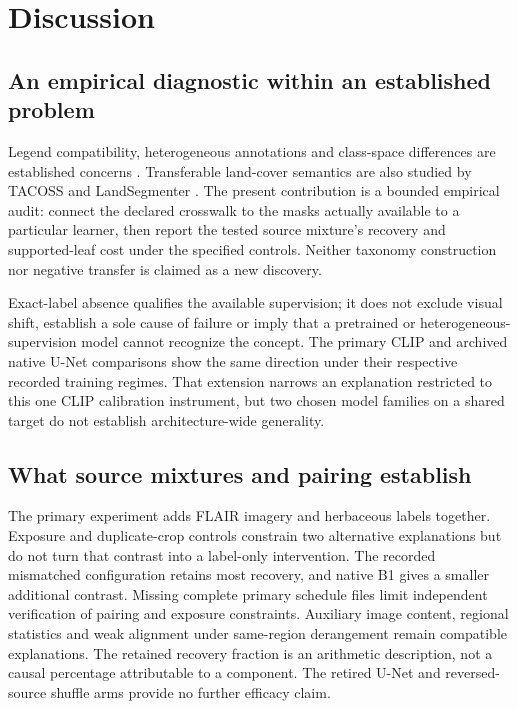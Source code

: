 \section{Discussion}
\label{sec:discussion}
\subsection{An empirical diagnostic within an established problem}
Legend compatibility, heterogeneous annotations and class-space differences are established concerns \citep{yang2017harmonization,lambert2020mseg,kim2022uniseg}. Transferable land-cover semantics are also studied by TACOSS and LandSegmenter \citep{zermatten2025tacoss,liu2026landsegmenter}. The present contribution is a bounded empirical audit: connect the declared crosswalk to the masks actually available to a particular learner, then report the tested source mixture's recovery and supported-leaf cost under the specified controls. Neither taxonomy construction nor negative transfer is claimed as a new discovery.

Exact-label absence qualifies the available supervision; it does not exclude visual shift, establish a sole cause of failure or imply that a pretrained or heterogeneous-supervision model cannot recognize the concept. The primary CLIP and archived native U-Net comparisons show the same direction under their respective recorded training regimes. That extension narrows an explanation restricted to this one CLIP calibration instrument, but two chosen model families on a shared target do not establish architecture-wide generality.

\subsection{What source mixtures and pairing establish}
The primary experiment adds FLAIR imagery and herbaceous labels together. Exposure and duplicate-crop controls constrain two alternative explanations but do not turn that contrast into a label-only intervention. The recorded mismatched configuration retains most recovery, and native B1 gives a smaller additional contrast. Missing complete primary schedule files limit independent verification of pairing and exposure constraints. Auxiliary image content, regional statistics and weak alignment under same-region derangement remain compatible explanations. The retained recovery fraction is an arithmetic description, not a causal percentage attributable to a component. The retired U-Net and reversed-source shuffle arms provide no further efficacy claim.

